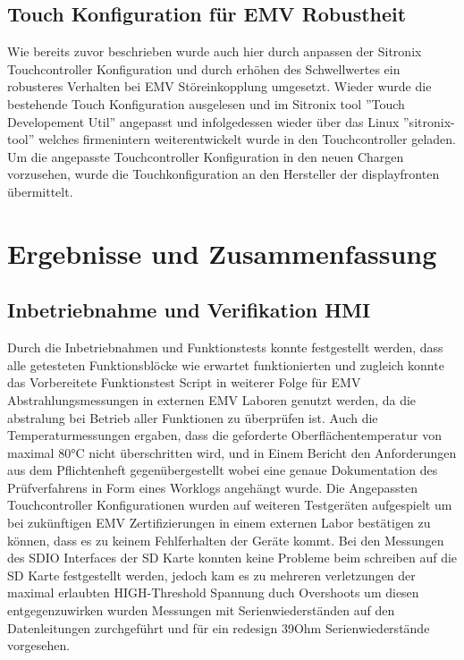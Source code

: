 \documentclass[praktikum,german]{hgbthesis}
\begin{document}
\section{Touch Konfiguration für EMV Robustheit}
Wie bereits zuvor beschrieben wurde auch hier durch anpassen der Sitronix Touchcontroller Konfiguration und durch erhöhen des Schwellwertes ein robusteres Verhalten bei EMV Störeinkopplung umgesetzt. Wieder wurde die bestehende Touch Konfiguration ausgelesen und im Sitronix tool ''Touch Developement Util'' angepasst und infolgedessen wieder über das Linux ''sitronix-tool'' welches firmenintern weiterentwickelt wurde in den Touchcontroller geladen. Um die angepasste Touchcontroller Konfiguration in den neuen Chargen vorzusehen, wurde die Touchkonfiguration an den Hersteller der displayfronten übermittelt.  

\chapter{Ergebnisse und Zusammenfassung}



\section{Inbetriebnahme und Verifikation HMI}
Durch die Inbetriebnahmen und Funktionstests konnte festgestellt werden, dass alle getesteten Funktionsblöcke wie erwartet funktionierten und zugleich konnte das Vorbereitete Funktionstest Script in weiterer Folge für EMV Abstrahlungsmessungen in externen EMV Laboren genutzt werden, da die abstralung bei Betrieb aller Funktionen zu überprüfen ist.
Auch die Temperaturmessungen ergaben, dass die geforderte Oberflächentemperatur von maximal 80°C nicht überschritten wird, und in Einem Bericht den Anforderungen aus dem Pflichtenheft gegenübergestellt wobei eine genaue Dokumentation des Prüfverfahrens in Form eines Worklogs angehängt wurde.
Die Angepassten Touchcontroller Konfigurationen wurden auf weiteren Testgeräten aufgespielt um bei zukünftigen EMV Zertifizierungen in einem externen Labor bestätigen zu können, dass es zu keinem Fehlferhalten der Geräte kommt. Bei den Messungen des SDIO Interfaces der SD Karte konnten keine Probleme beim schreiben auf die SD Karte festgestellt werden, jedoch kam es zu mehreren verletzungen der maximal erlaubten HIGH-Threshold Spannung duch Overshoots um diesen entgegenzuwirken wurden Messungen mit Serienwiederständen auf den Datenleitungen zurchgeführt und für ein redesign 39Ohm Serienwiederstände vorgesehen.
\end{document}
